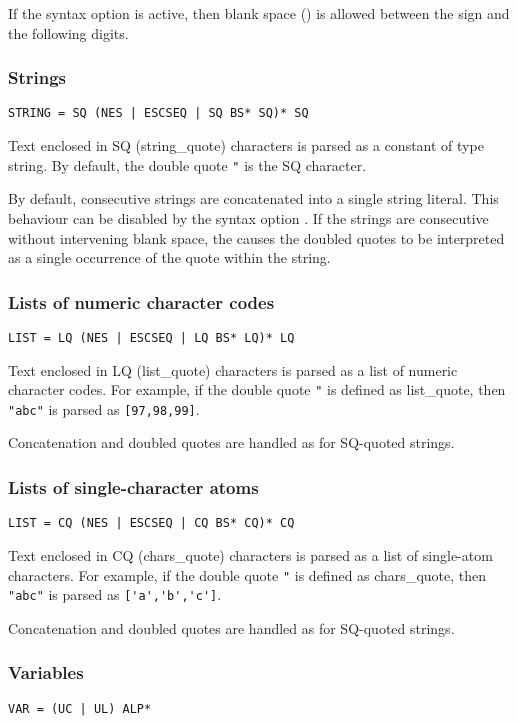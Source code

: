 If the syntax option  is active, then
blank space () is allowed between the sign and the following
digits.


\subsubsection{Strings}
\begin{verbatim}
STRING = SQ (NES | ESCSEQ | SQ BS* SQ)* SQ
\end{verbatim}
Text enclosed in SQ (string_quote) characters is parsed as a constant of type
string.  By default, the double quote \verb.". is the SQ character.

By default, consecutive strings are concatenated into a single string literal.
This behaviour can be disabled by the syntax option .
If the strings are consecutive without intervening blank space, the
 causes the doubled quotes to be
interpreted as a single occurrence of the quote within the string.

\subsubsection{Lists of numeric character codes}
\begin{verbatim}
LIST = LQ (NES | ESCSEQ | LQ BS* LQ)* LQ
\end{verbatim}
Text enclosed in LQ (list_quote) characters is parsed as a list of numeric
character codes.  For example, if the double quote \verb.". is defined as
list_quote, then \verb."abc". is parsed as \verb.[97,98,99]..

Concatenation and doubled quotes are handled as for SQ-quoted strings.

\subsubsection{Lists of single-character atoms}
\begin{verbatim}
LIST = CQ (NES | ESCSEQ | CQ BS* CQ)* CQ
\end{verbatim}
Text enclosed in CQ (chars_quote) characters is parsed as a list of single-atom
characters.  For example, if the double quote \verb.". is defined as
chars_quote, then \verb."abc". is parsed as \verb.['a','b','c']..

Concatenation and doubled quotes are handled as for SQ-quoted strings.

\subsubsection{Variables}
\begin{verbatim}
VAR = (UC | UL) ALP*
\end{verbatim}

